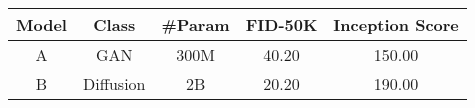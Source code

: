 \begin{table}[!ht]
    \centering
    \begin{tabular}{ccccc}
        \toprule
        Model & Class & \#Param & FID-50K & Inception Score \\
        \midrule
        A & GAN & 300M & 40.20 & 150.00 \\
        B & Diffusion & 2B & 20.20 & 190.00 \\
        \bottomrule
    \end{tabular}
\end{table}